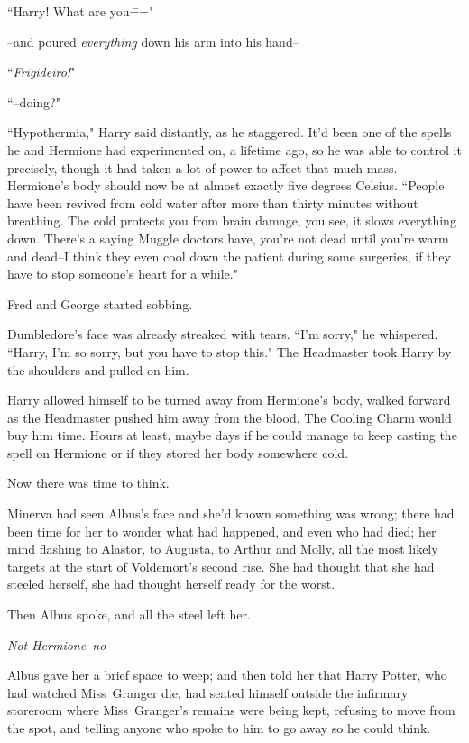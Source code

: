 ``Harry! What are you\==="

\---and poured \emph{everything} down his arm into his hand\---

``\emph{Frigideiro!}"

``\---doing?"

``Hypothermia," Harry said distantly, as he staggered. It'd been one of the spells he and Hermione had experimented on, a lifetime ago, so he was able to control it precisely, though it had taken a lot of power to affect that much mass. Hermione's body should now be at almost exactly five degrees Celsius. ``People have been revived from cold water after more than thirty minutes without breathing. The cold protects you from brain damage, you see, it slows everything down. There's a saying Muggle doctors have, you're not dead until you're warm and dead\---I think they even cool down the patient during some surgeries, if they have to stop someone's heart for a while."

Fred and George started sobbing.

Dumbledore's face was already streaked with tears. ``I'm sorry," he whispered. ``Harry, I'm so sorry, but you have to stop this." The Headmaster took Harry by the shoulders and pulled on him.

Harry allowed himself to be turned away from Hermione's body, walked forward as the Headmaster pushed him away from the blood. The Cooling Charm would buy him time. Hours at least, maybe days if he could manage to keep casting the spell on Hermione or if they stored her body somewhere cold.

Now there was time to think.

\later

Minerva had seen Albus's face and she'd known something was wrong; there had been time for her to wonder what had happened, and even who had died; her mind flashing to Alastor, to Augusta, to Arthur and Molly, all the most likely targets at the start of Voldemort's second rise. She had thought that she had steeled herself, she had thought herself ready for the worst.

Then Albus spoke, and all the steel left her.

\emph{Not Hermione\---no\---}

Albus gave her a brief space to weep; and then told her that Harry Potter, who had watched Miss~Granger die, had seated himself outside the infirmary storeroom where Miss~Granger's remains were being kept, refusing to move from the spot, and telling anyone who spoke to him to go away so he could think.

